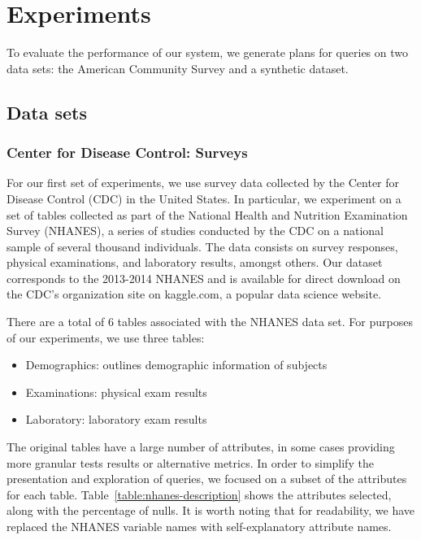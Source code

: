 \section{Experiments}
To evaluate the performance of our system, we generate plans for queries on two data sets: the American Community Survey and a synthetic dataset.
\subsection{Data sets} \label{subsec:datasets}
\subsubsection{Center for Disease Control: Surveys}
For our first set of experiments, we use survey data collected by the 
Center for Disease Control (CDC) in the United States. In particular, we
experiment on a set of tables collected as part of the National
Health and Nutrition Examination Survey (NHANES), a series of studies
conducted by the CDC on a national sample of several thousand individuals\cite{nhanes}.
The data consists on survey responses, physical examinations, and laboratory
results, amongst others. Our dataset corresponds to the 2013-2014 NHANES
and is available for direct download on the CDC's organization site on 
kaggle.com, a popular data science website.

There are a total of 6 tables associated with the NHANES data set. For purposes
of our experiments, we use three tables:

\begin{itemize}
	\item Demographics: outlines demographic information of subjects
	\item Examinations: physical exam results
	\item Laboratory: laboratory exam results
\end{itemize}

The original tables have a large number of attributes, in some cases providing more granular
tests results or alternative metrics. In order to simplify the presentation and
exploration of queries, we focused on a subset of the attributes for each table.
Table~\ref{table:nhanes-description} shows the attributes selected, along with the
percentage of nulls. It is worth noting that for readability, we have replaced the
NHANES variable names with self-explanatory attribute names.

